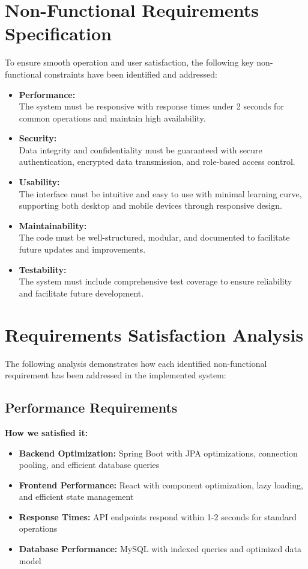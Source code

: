 \documentclass[a4paper,12pt]{report}
\begin{document}
\section{Non-Functional Requirements Specification}
To ensure smooth operation and user satisfaction, the following key non-functional constraints have been identified and addressed:

\begin{itemize}
    \item \textbf{Performance:} \\  
    The system must be responsive with response times under 2 seconds for common operations and maintain high availability.

    \item \textbf{Security:} \\  
    Data integrity and confidentiality must be guaranteed with secure authentication, encrypted data transmission, and role-based access control.

    \item \textbf{Usability:} \\  
    The interface must be intuitive and easy to use with minimal learning curve, supporting both desktop and mobile devices through responsive design.

    \item \textbf{Maintainability:} \\  
    The code must be well-structured, modular, and documented to facilitate future updates and improvements.

    \item \textbf{Testability:} \\  
    The system must include comprehensive test coverage to ensure reliability and facilitate future development.
\end{itemize}

\section{Requirements Satisfaction Analysis}
The following analysis demonstrates how each identified non-functional requirement has been addressed in the implemented system:

\subsection{Performance Requirements}
\textbf{How we satisfied it:}
\begin{itemize}
    \item \textbf{Backend Optimization:} Spring Boot with JPA optimizations, connection pooling, and efficient database queries
    \item \textbf{Frontend Performance:} React with component optimization, lazy loading, and efficient state management
    \item \textbf{Response Times:} API endpoints respond within 1-2 seconds for standard operations
    \item \textbf{Database Performance:} MySQL with indexed queries and optimized data model
\end{itemize}
\end{document}
